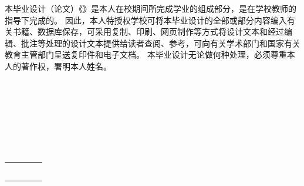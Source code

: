 
\begin{authorizationzh}
	
本毕业设计（论文）《\qquad \qquad \qquad \qquad \qquad \qquad \qquad \qquad \qquad》是本人在校期间所完成学业的组成部分，是在学校教师的指导下完成的。
因此，本人特授权学校可将本毕业设计的全部或部分内容编入有关书籍、数据库保存，可采用复制、印刷、网页制作等方式将设计文本和经过编辑、批注等处理的设计文本提供给读者查阅、参考，可向有关学术部门和国家有关教育主管部门呈送复印件和电子文档。
本毕业设计无论做何种处理，必须尊重本人的著作权，署明本人姓名。
\\
\\
\\
\\
\\
\\
\\
\\

	
	\vspace{30pt}
	\begin{tabular}{llll}
		\makebox[4em][s]{设计作者（签字）} & \makebox[150pt][c]{  } & \makebox[2em][s]{时间} & \makebox[100pt][c]{\qquad 年\quad 月\quad   日 }\\
		\\ \\ \\
		\makebox[4em][s]{指导教师已阅（签字）} & \makebox[150pt][c]{  } & \makebox[2em][s]{时间} & \makebox[100pt][c]{\qquad 年\quad 月\quad   日 }\\
	\end{tabular}

	
	
\end{authorizationzh}